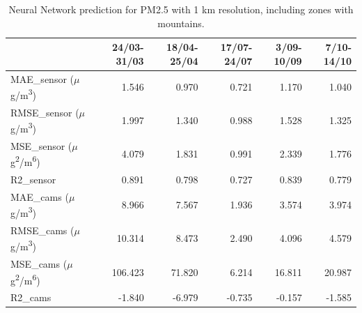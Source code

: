 \begin{table}[H]
\begin{tabular}{lrrrrr}
\toprule
 &  24/03-31/03 &  18/04-25/04 &  17/07-24/07 &  3/09-10/09 &  7/10-14/10 \\
\midrule
 MAE\_sensor ($\mu$g/m\textsuperscript{3})&        1.546 &        0.970 &        0.721 &       1.170 &       1.040 \\
RMSE\_sensor ($\mu$g/m\textsuperscript{3})&        1.997 &        1.340 &        0.988 &       1.528 &       1.325 \\
 MSE\_sensor ($\mu$g\textsuperscript{2}/m\textsuperscript{6})&        4.079 &        1.831 &        0.991 &       2.339 &       1.776 \\
  R2\_sensor &        0.891 &        0.798 &        0.727 &       0.839 &       0.779 \\
   MAE\_cams ($\mu$g/m\textsuperscript{3})&        8.966 &        7.567 &        1.936 &       3.574 &       3.974 \\
  RMSE\_cams ($\mu$g/m\textsuperscript{3})&       10.314 &        8.473 &        2.490 &       4.096 &       4.579 \\
   MSE\_cams ($\mu$g\textsuperscript{2}/m\textsuperscript{6})&      106.423 &       71.820 &        6.214 &      16.811 &      20.987 \\
    R2\_cams &       -1.840 &       -6.979 &       -0.735 &      -0.157 &      -1.585 \\
\bottomrule
\end{tabular}
\caption{Neural Network prediction for PM2.5 with 1 km resolution, including zones with mountains.}
\end{table}
